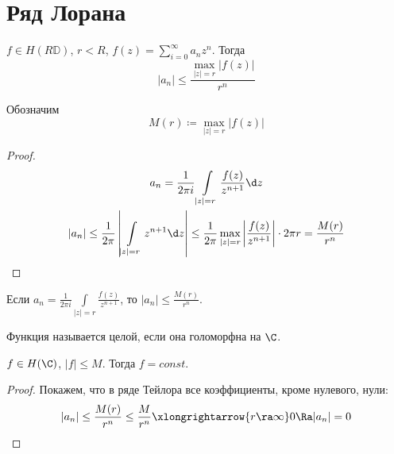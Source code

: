 \section{Ряд Лорана}

\begin{theorem}
	$f \in H(R\mathbb D)$, $r < R$, $f(z) = \sum_{i=0}^\infty a_nz^n$.
	Тогда
	\[ |a_n| \le \frac{\max_{|z| = r} |f(z)|}{r^n} \]
\end{theorem}

Обозначим
\[ M(r) \coloneqq \max_{|z| = r} |f(z)| \]
\begin{proof}
	\begin{gather*}
		a_n = \frac1{2\pi i} \int\limits_{|z| = r} \frac{f(z)}{z^{n+1}} \d z \\
		|a_n|
		\le \frac1{2\pi} \left| \int\limits_{|z| = r}{z^{n+1}} \d z\right|
		\le \frac1{2\pi} \max_{|z| = r} \left| \frac{f(z)}{z^{n+1}}\right| \cdot 2\pi r = \frac{M(r)}{r^n}
	\end{gather*}
\end{proof}

\begin{Rem}
	Если $a_n = \frac1{2\pi i} \int\limits_{|z| = r} \frac{f(z)}{z^{n+1}}$, то $|a_n| \le \frac{M(r)}{r^n}$.
\end{Rem}

\begin{Def}
	Функция называется целой, если она голоморфна на $\C$.
\end{Def}

\begin{theorem}[Лиувилля]
	$f \in H(\C)$, $|f| \le M$.
	Тогда $f = const$.
\end{theorem}
\begin{proof}
	Покажем, что в ряде Тейлора все коэффициенты, кроме нулевого, нули:
	\[ |a_n| \le \frac{M(r)}{r^n} \le \frac M{r^n} \xlongrightarrow{r \ra \infty} 0 \Ra |a_n| = 0 \]
\end{proof}

